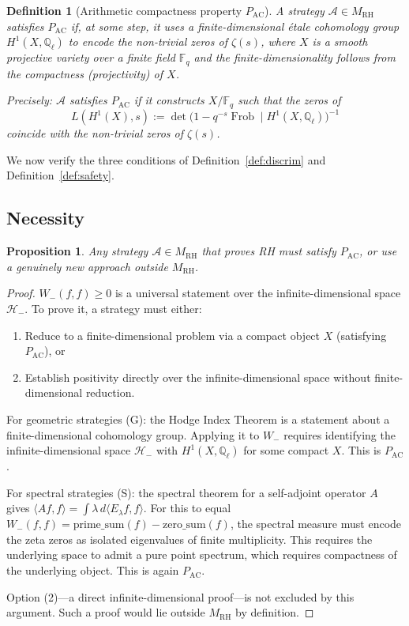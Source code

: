 \documentclass[12pt]{article}
\newtheorem{proposition}[theorem]{Proposition}
\newtheorem{definition}[theorem]{Definition}
\DeclareMathOperator{\Frob}{Frob}
\newcommand{\FF}{\mathbb{F}}
\newcommand{\Ql}{\mathbb{Q}_\ell}
\newcommand{\Hminus}{\mathcal{H}_-}
\newcommand{\MRH}{M_{\mathrm{RH}}}
\newcommand{\PAC}{P_{\mathrm{AC}}}
\begin{document}
\begin{definition}[Arithmetic compactness property $\PAC$]
\label{def:pac}
A strategy $\mathcal{A} \in \MRH$ satisfies $\PAC$ if, at some step,
it uses a finite-dimensional \'etale cohomology group $H^1(X, \Ql)$
to encode the non-trivial zeros of $\zeta(s)$, where $X$ is a smooth
projective variety over a finite field $\FF_q$ and the
finite-dimensionality follows from the compactness (projectivity) of $X$.

Precisely: $\mathcal{A}$ satisfies $\PAC$ if it constructs $X/\FF_q$
such that the zeros of
\[
L(H^1(X), s) := \det\!\bigl(1 - q^{-s}\Frob \mid H^1(X,\Ql)\bigr)^{-1}
\]
coincide with the non-trivial zeros of $\zeta(s)$.
\end{definition}

We now verify the three conditions of Definition~\ref{def:discrim}
and Definition~\ref{def:safety}.

\subsection{Necessity}

\begin{proposition}
\label{prop:necessity}
Any strategy $\mathcal{A} \in \MRH$ that proves RH must satisfy $\PAC$,
or use a genuinely new approach outside $\MRH$.
\end{proposition}

\begin{proof}
$W_-(f,f) \geq 0$ is a universal statement over the
infinite-dimensional space $\Hminus$. To prove it, a strategy must
either:
\begin{enumerate}
\item Reduce to a finite-dimensional problem via a compact object $X$
  (satisfying $\PAC$), or
\item Establish positivity directly over the infinite-dimensional space
  without finite-dimensional reduction.
\end{enumerate}
For geometric strategies (G): the Hodge Index Theorem is a statement
about a finite-dimensional cohomology group. Applying it to $W_-$
requires identifying the infinite-dimensional space $\Hminus$ with
$H^1(X,\Ql)$ for some compact $X$. This is $\PAC$.

For spectral strategies (S): the spectral theorem for a self-adjoint
operator $A$ gives $\langle Af, f\rangle = \int \lambda\, d\langle
E_\lambda f, f\rangle$. For this to equal $W_-(f,f) =
\mathrm{prime\_sum}(f) - \mathrm{zero\_sum}(f)$, the spectral measure
must encode the zeta zeros as isolated eigenvalues of finite
multiplicity. This requires the underlying space to admit a pure point
spectrum, which requires compactness of the underlying object. This
is again $\PAC$.

Option (2)---a direct infinite-dimensional proof---is not excluded
by this argument. Such a proof would lie outside $\MRH$ by definition.
\end{proof}
\end{document}
